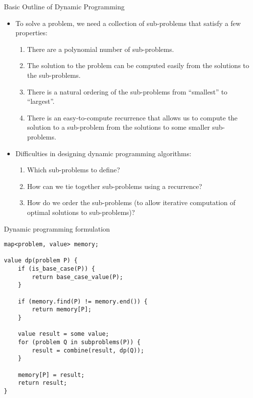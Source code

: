    \begin{frame}[fragile]{Basic Outline of Dynamic Programming}
  \begin{itemize}
  \item To solve a problem, we need a collection of sub-problems that
    satisfy a few properties:
    \begin{enumerate}
    \item There are a polynomial number of sub-problems.
    \item The solution to the problem can be computed easily from the
      solutions to the sub-problems.
    \item There is a natural ordering of the sub-problems from
      ``smallest'' to ``largest''.
    \item There is an easy-to-compute recurrence that allows us to
      compute the solution to a sub-problem from the solutions to some
      smaller sub-problems.
    \end{enumerate} 
  \item Difficulties in designing dynamic programming algorithms:
    \begin{enumerate}
    \item Which sub-problems to define?
    \item How can we tie together sub-problems using a recurrence?
    \item How do we order the sub-problems (to allow iterative
      computation of optimal solutions to sub-problems)?
    \end{enumerate}
  \end{itemize}
\end{frame}

   \begin{frame}[fragile]{Dynamic programming formulation}
    \begin{lstlisting}
map<problem, value> memory;

value dp(problem P) {
    if (is_base_case(P)) {
        return base_case_value(P);
    }

    if (memory.find(P) != memory.end()) {
        return memory[P];
    }

    value result = some value;
    for (problem Q in subproblems(P)) {
        result = combine(result, dp(Q));
    }

    memory[P] = result;
    return result;
}
    \end{lstlisting}
\end{frame}


